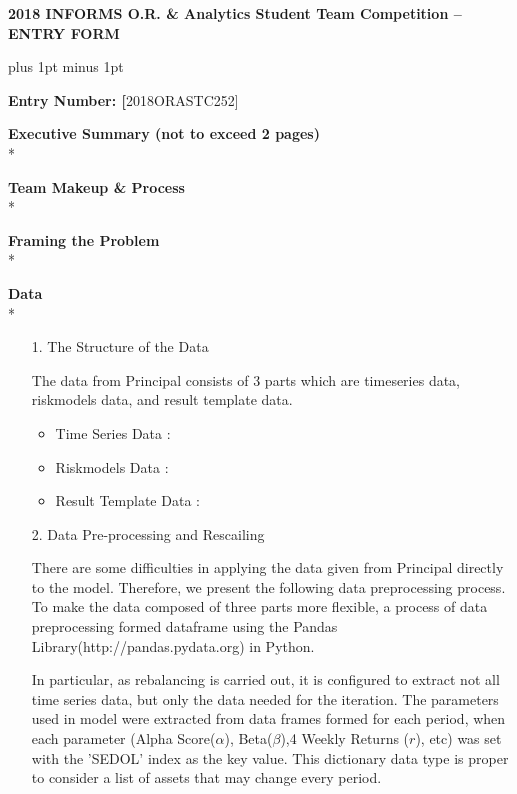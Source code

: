 \documentclass[11pt]{article}
\begin{document}
\centerline{\textbf{2018 INFORMS O.R. {\&} Analytics Student Team Competition -- ENTRY FORM}}

\baselineskip16pt plus 1pt minus 1pt


\textbf{Entry Number: [}2018ORASTC252]

\textbf{Executive Summary (not to exceed 2 pages)}\\*


\textbf{Team Makeup {\&} Process}\\*

\textbf{Framing the Problem}\\*


\textbf{Data}\\*
\begin{itemize}
\item[1.] The Structure of the Data %
\item[] The data from Principal consists of 3 parts which are timeseries data, riskmodels data, and result template data. 
\begin{itemize}
	\item Time Series Data :
	\begin{itemize}
		\item[] 
	\end{itemize}
	\item Riskmodels Data :
	\begin{itemize}
		\item[] 
	\end{itemize}
	\item Result Template Data :
	\begin{itemize}
		\item[] 
	\end{itemize}
\end{itemize}

\item[2.] Data Pre-processing and Rescailing

	\item[ ] There are some difficulties in applying the data given from Principal directly to the model. Therefore, we present the following data preprocessing process. To make the data composed of three parts more flexible, a process of data preprocessing formed dataframe using the Pandas Library(http://pandas.pydata.org) in Python. 
	
	In particular, as rebalancing is carried out, it is configured to extract not all time series data, but only the data needed for the iteration. The parameters used in model were extracted from data frames formed for each period, when each parameter (Alpha Score($\alpha$), Beta($\beta$),4 Weekly Returns ($r$), etc) was set with the 'SEDOL' index as the key value. This dictionary data type is proper to consider a list of assets that may change every period.
	

\end{itemize}
\end{document}
